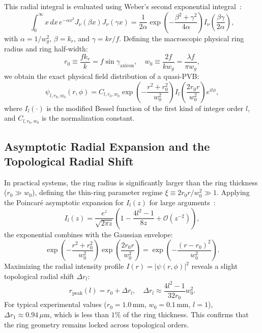 \documentclass{optica-article}
\begin{document}
This radial integral is evaluated using Weber's second exponential integral~\cite{Gradshteyn2014}:
\begin{equation}
\int_0^\infty x \, dx \, e^{-\alpha x^2} J_\nu(\beta x) J_\nu(\gamma x) = \frac{1}{2\alpha} \exp\left( - \frac{\beta^2 + \gamma^2}{4\alpha} \right) I_\nu\left( \frac{\beta \gamma}{2\alpha} \right),
\end{equation}
with $\alpha = 1 / w_g^2$, $\beta = k_r$, and $\gamma = k r / f$. Defining the macroscopic physical ring radius and ring half-width:
\begin{equation}
r_0 \equiv \frac{f k_r}{k} = f \sin \gamma_{\text{axicon}}, \quad w_0 \equiv \frac{2 f}{k w_g} = \frac{\lambda f}{\pi w_g},
\label{eq:pvb_params}
\end{equation}
we obtain the exact physical field distribution of a quasi-PVB:
\begin{equation}
\boxed{\psi_{l, r_0, w_0}(r, \phi) = C_{l, r_0, w_0} \exp\left( - \frac{r^2 + r_0^2}{w_0^2} \right) I_l\left( \frac{2 r_0 r}{w_0^2} \right) e^{i l \phi},}
\label{eq:exact_pvb_field}
\end{equation}
where $I_l(\cdot)$ is the modified Bessel function of the first kind of integer order $l$, and $C_{l, r_0, w_0}$ is the normalization constant.

\subsection{Asymptotic Radial Expansion and the Topological Radial Shift}

In practical systems, the ring radius is significantly larger than the ring thickness ($r_0 \gg w_0$), defining the thin-ring parameter regime $\xi \equiv 2 r_0 r / w_0^2 \gg 1$. Applying the Poincaré asymptotic expansion for $I_l(z)$ for large arguments~\cite{Gradshteyn2014}:
\begin{equation}
I_l(z) = \frac{e^z}{\sqrt{2\pi z}} \left( 1 - \frac{4l^2 - 1}{8 z} + \mathcal{O}(z^{-2}) \right),
\end{equation}
the exponential combines with the Gaussian envelope:
\begin{equation}
\exp\left( - \frac{r^2 + r_0^2}{w_0^2} \right) \exp\left( \frac{2 r_0 r}{w_0^2} \right) = \exp\left( - \frac{(r - r_0)^2}{w_0^2} \right).
\end{equation}
Maximizing the radial intensity profile $I(r) = |\psi(r, \phi)|^2$ reveals a slight topological radial shift $\Delta r_l$:
\begin{equation}
r_{\text{peak}}(l) = r_0 + \Delta r_l, \quad \Delta r_l \approx \frac{4l^2 - 1}{32 r_0} w_0^2.
\label{eq:topological_shift}
\end{equation}
For typical experimental values ($r_0 = 1.0\,\text{mm}$, $w_0 = 0.1\,\text{mm}$, $l = 1$), $\Delta r_1 \approx 0.94\,\mu\text{m}$, which is less than $1\%$ of the ring thickness. This confirms that the ring geometry remains locked across topological orders.
\end{document}

